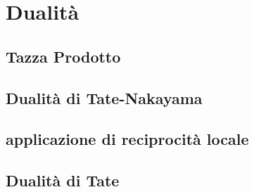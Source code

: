 \chapter{Dualità}

\section{Tazza Prodotto}

\section{Dualità di Tate-Nakayama}

\section{applicazione di reciprocità locale}

\section{Dualità di Tate}